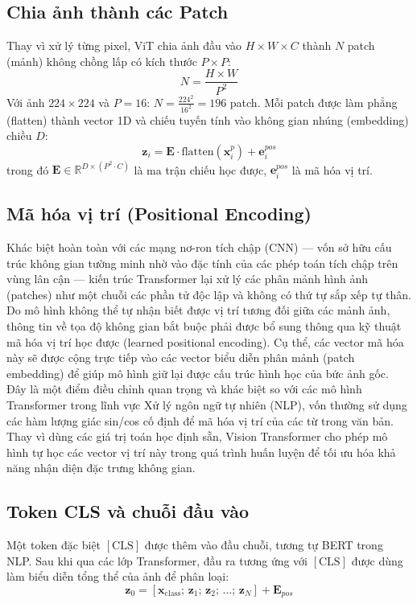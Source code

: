 \subsection{Chia ảnh thành các Patch}
Thay vì xử lý từng pixel, ViT chia ảnh đầu vào $H \times W \times C$ thành $N$ patch (mảnh) không chồng lấp có kích thước $P \times P$:
\begin{equation}
    N = \frac{H \times W}{P^2}
    \label{eq:num_patches}
\end{equation}
Với ảnh $224 \times 224$ và $P = 16$: $N = \frac{224^2}{16^2} = 196$ patch. Mỗi patch được làm phẳng (flatten) thành vector 1D và chiếu tuyến tính vào không gian nhúng (embedding) chiều $D$:
\begin{equation}
    \mathbf{z}_i = \mathbf{E} \cdot \text{flatten}(\mathbf{x}_i^p) + \mathbf{e}_i^{pos}
    \label{eq:patch_embed}
\end{equation}
trong đó $\mathbf{E} \in \mathbb{R}^{D \times (P^2 \cdot C)}$ là ma trận chiếu học được, $\mathbf{e}_i^{pos}$ là mã hóa vị trí.

\subsection{Mã hóa vị trí (Positional Encoding)}
Khác biệt hoàn toàn với các mạng nơ-ron tích chập (CNN) — vốn sở hữu cấu trúc không gian tường minh nhờ vào đặc tính của các phép toán tích chập trên vùng lân cận — kiến trúc Transformer lại xử lý các phân mảnh hình ảnh (patches) như một chuỗi các phần tử độc lập và không có thứ tự sắp xếp tự thân. Do mô hình không thể tự nhận biết được vị trí tương đối giữa các mảnh ảnh, thông tin về tọa độ không gian bắt buộc phải được bổ sung thông qua kỹ thuật mã hóa vị trí học được (learned positional encoding). Cụ thể, các vector mã hóa này sẽ được cộng trực tiếp vào các vector biểu diễn phân mảnh (patch embedding) để giúp mô hình giữ lại được cấu trúc hình học của bức ảnh gốc. Đây là một điểm điều chỉnh quan trọng và khác biệt so với các mô hình Transformer trong lĩnh vực Xử lý ngôn ngữ tự nhiên (NLP), vốn thường sử dụng các hàm lượng giác sin/cos cố định để mã hóa vị trí của các từ trong văn bản. Thay vì dùng các giá trị toán học định sẵn, Vision Transformer cho phép mô hình tự học các vector vị trí này trong quá trình huấn luyện để tối ưu hóa khả năng nhận diện đặc trưng không gian.

\subsection{Token CLS và chuỗi đầu vào}
Một token đặc biệt $[\text{CLS}]$ được thêm vào đầu chuỗi, tương tự BERT trong NLP. Sau khi qua các lớp Transformer, đầu ra tương ứng với $[\text{CLS}]$ được dùng làm biểu diễn tổng thể của ảnh để phân loại:
\begin{equation}
    \mathbf{z}_0 = [\mathbf{x}_\text{class};\, \mathbf{z}_1;\, \mathbf{z}_2;\, \ldots;\, \mathbf{z}_N] + \mathbf{E}_{pos}
    \label{eq:cls_token}
\end{equation}
\newpage
